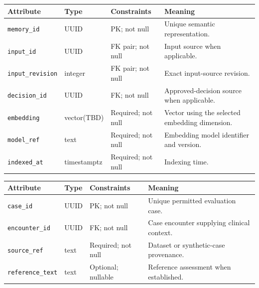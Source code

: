 \begin{reporttable}
\setlength{\tabcolsep}{5pt}
\centering
\small
\caption{SemanticMemory attributes, types and constraints.}
\label{tab:kashaf:dict-semanticmemory}
\begin{tabular}{|p{}|p{}|p{}|p{}|}
\hline
Attribute & Type & Constraints & Meaning \\ \hline
\texttt{memory\_id} & UUID & PK; not null & Unique semantic representation. \\ \hline
\texttt{input\_id} & UUID & FK pair; not null & Input source when applicable. \\ \hline
\texttt{input\_revision} & integer & FK pair; not null & Exact input-source revision. \\ \hline
\texttt{decision\_id} & UUID & FK; not null & Approved-decision source when applicable. \\ \hline
\texttt{embedding} & vector(TBD) & Required; not null & Vector using the selected embedding dimension. \\ \hline
\texttt{model\_ref} & text & Required; not null & Embedding model identifier and version. \\ \hline
\texttt{indexed\_at} & timestamptz & Required; not null & Indexing time. \\ \hline
\end{tabular}
\end{reporttable}

\begin{reporttable}
\setlength{\tabcolsep}{5pt}
\centering
\small
\caption{EvaluationCase attributes, types and constraints.}
\label{tab:kashaf:dict-evaluationcase}
\begin{tabular}{|p{}|p{}|p{}|p{}|}
\hline
Attribute & Type & Constraints & Meaning \\ \hline
\texttt{case\_id} & UUID & PK; not null & Unique permitted evaluation case. \\ \hline
\texttt{encounter\_id} & UUID & FK; not null & Case encounter supplying clinical context. \\ \hline
\texttt{source\_ref} & text & Required; not null & Dataset or synthetic-case provenance. \\ \hline
\texttt{reference\_text} & text & Optional; nullable & Reference assessment when established. \\ \hline
\end{tabular}
\end{reporttable}

